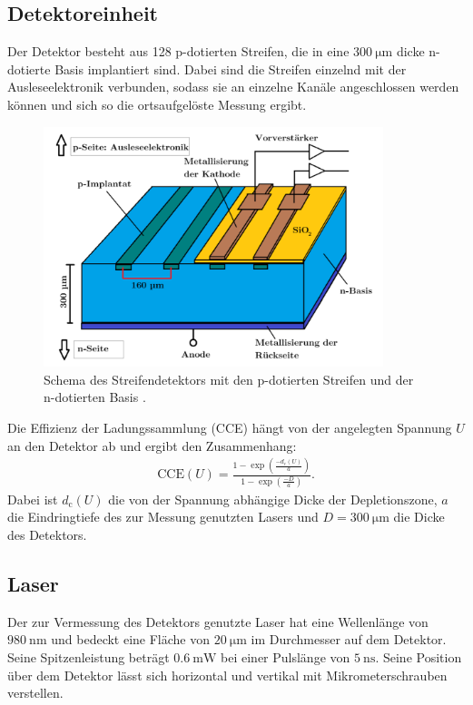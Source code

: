 \subsection{Detektoreinheit}
Der Detektor besteht aus 128 p-dotierten Streifen, die in eine $\SI{300}{\micro\meter}$ dicke n-dotierte Basis implantiert sind.
Dabei sind die Streifen einzelnd mit der Ausleseelektronik verbunden, sodass sie an einzelne Kanäle angeschlossen werden können und sich so die ortsaufgelöste Messung ergibt.
\begin{figure}
  \centering
  \includegraphics[height=7cm]{TimosAufrisse/detektorStreifen.png}
  \caption{Schema des Streifendetektors mit den p-dotierten Streifen und der n-dotierten Basis \cite{anleitung}.}
  \label{fig:detektorStreifen}
\end{figure}
Die Effizienz der Ladungssammlung (CCE) hängt von der angelegten Spannung $U$ an den Detektor ab und ergibt den Zusammenhang:
\begin{align}
  \text{CCE}(U) = \frac{1-\exp(\frac{-d_\text{c}(U)}{a})}{1-\exp(\frac{-D}{a})}.
  \label{eqn:cce}
\end{align}
Dabei ist $d_\text{c}(U)$ die von der Spannung abhängige Dicke der Depletionszone, $a$ die Eindringtiefe des zur Messung genutzten Lasers und $D = \SI{300}{\micro\meter}$ die Dicke des Detektors.

\subsection{Laser}
Der zur Vermessung des Detektors genutzte Laser hat eine Wellenlänge von $\SI{980}{\nano\meter}$ und bedeckt eine Fläche von $\SI{20}{\micro\meter}$ im Durchmesser auf dem Detektor. Seine Spitzenleistung beträgt $\SI{0.6}{\milli\watt}$ bei einer Pulslänge von $\SI{5}{\nano\second}$. Seine Position über dem Detektor lässt sich horizontal und vertikal mit Mikrometerschrauben verstellen.

